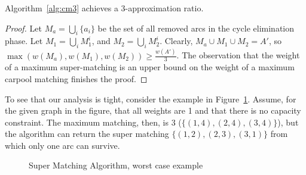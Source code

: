 \begin{theorem}
Algorithm~\ref{alg:cm3} achieves a 3-approximation ratio.
\end{theorem}

\begin{proof}
Let $M_a = \bigcup_i \{a_i\}$ be the set of all removed arcs in the cycle
elimination phase.
Let $M_1 = \bigcup_i M^i_1$, and $M_2 = \bigcup_i M^i_2$.
Clearly, $M_a \cup M_1 \cup M_2 = A'$, 
so $\max(w(M_a), w(M_1), w(M_2)) \geq
\frac{w(A')}{3}$.
The observation that the weight of a maximum super-matching is an upper bound on
the weight of a maximum carpool matching finishes the proof. 
\end{proof}

To see that our analysis is tight, consider the example in
Figure~\ref{fig:3cm-tight-fig}. 
Assume, for the given graph in the figure, 
that all weights are 1 and that there is no capacity constraint.
The maximum matching, then, is 3 ($\{(1,4), (2,4), (3,4)\}$), 
but the algorithm can return the super matching $\{(1,2), (2,3), (3,1)\}$ from which
only one arc can survive.  

\begin{figure}
\centering

\caption{
\label{fig:3cm-tight-fig}
Super Matching Algorithm, worst case example
}
\end{figure}
